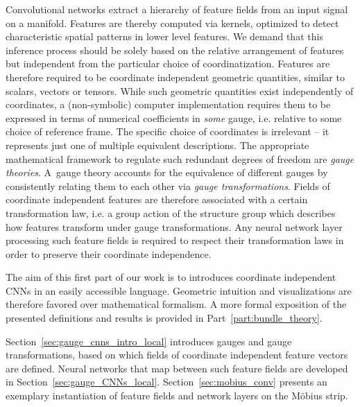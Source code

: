

\label{part:local_theory}


Convolutional networks extract a hierarchy of feature fields from an input signal on a manifold.
Features are thereby computed via kernels, optimized to detect characteristic spatial patterns in lower level features.
We demand that this inference process should be solely based on the relative arrangement of features but independent from the particular choice of coordinatization.
Features are therefore required to be coordinate independent geometric quantities, similar to scalars, vectors or tensors.
While such geometric quantities exist independently of coordinates, a (non-symbolic) computer implementation requires them to be expressed in terms of numerical coefficients in \emph{some} gauge, i.e. relative to some choice of reference frame.
The specific choice of coordinates is irrelevant -- it represents just one of multiple equivalent descriptions.
The appropriate mathematical framework to regulate such redundant degrees of freedom are \emph{gauge theories}.
A~gauge theory accounts for the equivalence of different gauges by consistently relating them to each other via \emph{gauge transformations}.
Fields of coordinate independent features are therefore associated with a certain transformation law, i.e. a group action of the structure group which describes how features transform under gauge transformations.
Any neural network layer processing such feature fields is required to respect their transformation laws in order to preserve their coordinate independence.


The aim of this first part of our work is to introduces coordinate independent CNNs in an easily accessible language.
Geometric intuition and visualizations are therefore favored over mathematical formalism.
A more formal exposition of the presented definitions and results is provided in Part~\ref{part:bundle_theory}.


\etocsettocstyle{}{} %
\localtableofcontents

\vspace*{2.ex}

Section~\ref{sec:gauge_cnns_intro_local} introduces gauges and gauge transformations, based on which fields of coordinate independent feature vectors are defined.
Neural networks that map between such feature fields are developed in Section~\ref{sec:gauge_CNNs_local}.
Section~\ref{sec:mobius_conv} presents an exemplary instantiation of feature fields and network layers on the M\"obius strip.
